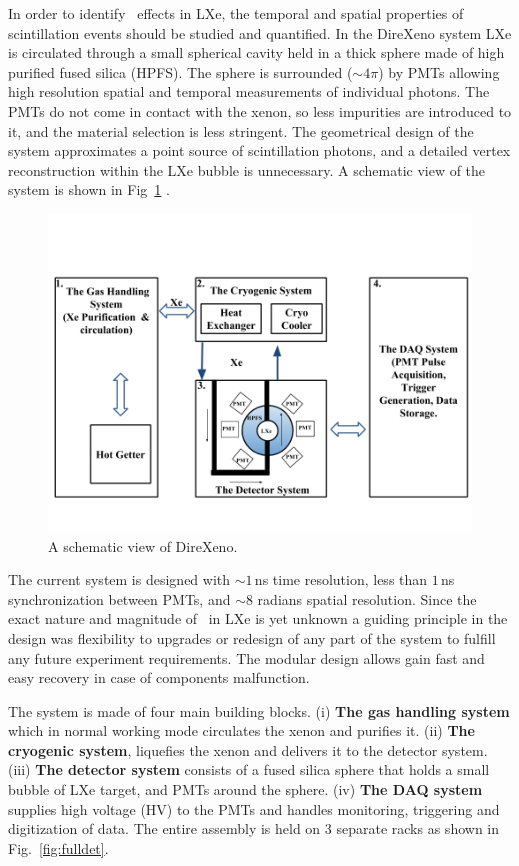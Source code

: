 In order to identify \superradiance\ effects in LXe, the temporal and spatial properties of scintillation events should be studied and quantified. In the DireXeno system LXe is circulated through a small spherical cavity held in a thick sphere made of high purified fused silica (HPFS). The sphere is surrounded ($\sim4\pi$) by PMTs allowing high resolution spatial and temporal measurements of individual photons. The PMTs do not come in contact with the xenon, so less impurities are introduced to it, and the material selection is less stringent. The geometrical design of the system approximates a point  source of scintillation photons, and a detailed vertex reconstruction within the LXe bubble is unnecessary. A schematic view of the system is shown in Fig~\ref{fig:detSch} . 

\begin{figure}[h]
\centerline{\includegraphics[width=0.8\linewidth]{fig/DetSch.png}}
\caption{A schematic view of DireXeno.}
\label{fig:detSch}
\end{figure}


The current system is designed with $\sim1$\,ns time resolution, less than $1$\,ns synchronization between PMTs, and $\sim8$ radians spatial resolution. Since the exact nature and magnitude of \superradiance\ in LXe is yet unknown a guiding principle in the design was flexibility to upgrades or redesign of any part of the system to fulfill any future experiment requirements. The modular design allows gain fast and easy recovery in case of components malfunction.

The system is made of four main building blocks. (i) \textbf{The gas handling system} which in normal working mode circulates the xenon and purifies it. (ii) \textbf{The cryogenic system}, liquefies the xenon and 
delivers it to the detector system. (iii) \textbf{The detector system} consists of a fused silica sphere that 
holds a small bubble of LXe target, and PMTs around the sphere. (iv) \textbf{The DAQ system} supplies high voltage (HV) 
to the PMTs and handles monitoring, triggering and digitization of data. The entire assembly is held on 3 separate racks as shown in Fig.~\ref{fig:fulldet}.




